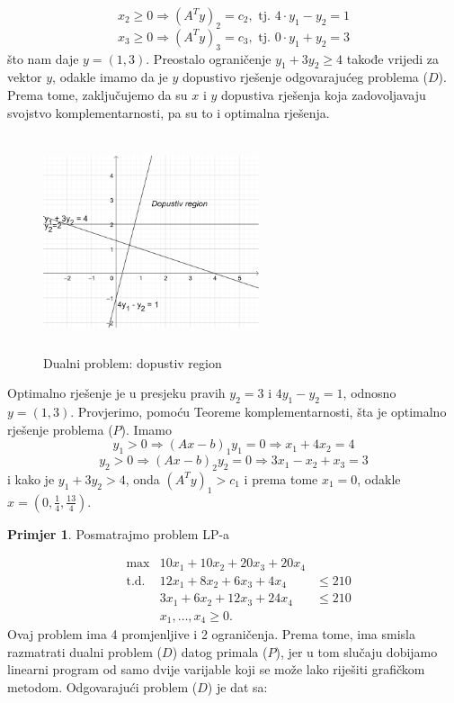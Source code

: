 \documentclass[a4paper, utf8, 11pt, colorlinks]{book}
\theoremstyle{definition}
\newtheorem{primjer}{Primjer}[chapter]
\begin{document}
$$x_2 \geq 0 \Rightarrow  (A^T y)_2  = c_2, \mbox{ tj. } 4 \cdot y_1 - y_2 = 1$$
$$x_3 \geq 0 \Rightarrow  (A^T y)_3  = c_3, \mbox{ tj. } 0 \cdot y_1 + y_2 = 3$$
što nam daje  $y = (1, 3)$. Preostalo ograničenje $y_1 + 3 y_2 \geq 4$ takođe vrijedi za vektor $y$, odakle imamo da je $y$ dopustivo rješenje odgovarajućeg problema  ($D$).  Prema tome, zaključujemo da su $x$ i $y$ dopustiva rješenja koja zadovoljavaju svojstvo komplementarnosti, pa su to i optimalna rješenja. 

\begin{figure}[!ht]
    \centering
     \includegraphics[width=180pt, height=180pt]{fig5.eps}
    \caption{Dualni problem: dopustiv region}
    \label{fig:fig5}
\end{figure}
Optimalno rješenje je u presjeku pravih $y_2 = 3$ i $4y_1 - y_2 = 1$, odnosno $y = (1, 3)$. Provjerimo, pomoću Teoreme komplementarnosti, šta je optimalno rješenje problema ($P$). Imamo 
$$y_1 > 0 \Rightarrow (Ax - b)_1 y_1 = 0 \Rightarrow x_1 + 4 x_2 = 4 $$
$$y_2 > 0 \Rightarrow (Ax - b)_2 y_2 = 0 \Rightarrow 3x_1 - x_2 + x_3 = 3 $$
i kako je $y_1 + 3 y_2 > 4$, onda $(A^Ty)_1 > c_1$ i prema tome $x_1 =0$, 
odakle $x =(0, \frac{1}{4}, \frac{13}{4})$. 

\begin{primjer}\label{primjer:dual} Posmatrajmo problem LP-a
	\end{primjer}
$$\begin{array}{llll}
   &\max                     &10 x_1 + 10 x_2 + 20 x_3 + 20 x_4  & \\
   &\mbox{t.d. }      &12 x_1 + 8 x_2  + 6 x_3  + 4 x_4   & \leq 210 \\
    &                        &3 x_1 + 6 x_2   + 12 x_3 + 24 x_4 & \leq 210 \\
     &                       & x_1,\ldots, x_4 \geq 0.                                 &
\end{array}
$$
Ovaj problem ima 4 promjenljive i 2 ograničenja. Prema tome, ima smisla razmatrati dualni problem  ($D$)  datog primala  ($P$),  jer u tom slučaju dobijamo linearni program od samo dvije varijable koji se može lako riješiti grafičkom metodom.  Odgovarajući problem ($D$) je dat sa:
\end{document}
